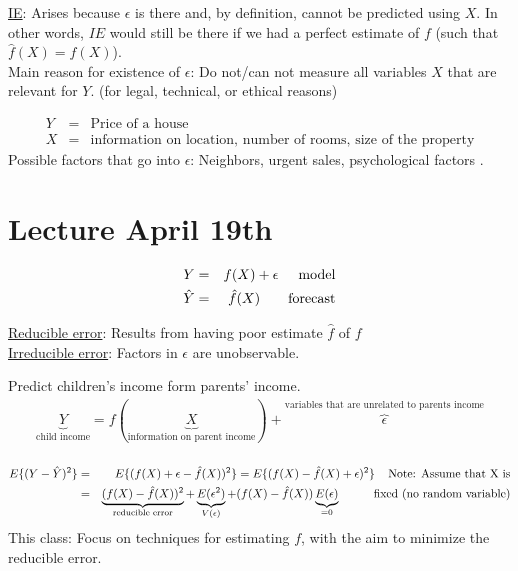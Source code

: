 \documentclass[11pt,a4paper,numbers=endperiod]{scrartcl}
\newcommand{\tit}[1]{\begin{large} \underline{\text{#1}}\end{large}}
\begin{document}
\underline{IE}: Arises because $\epsilon$ is there and, by definition, cannot be predicted using $X$. In other words, $IE$ would still be there if we had a perfect estimate of $f$ (such that $\hat{f}(X) = f(X)$).\\

Main reason for existence of $\epsilon$: Do not/can not measure all variables $X$ that are relevant for $Y$. (for legal, technical, or ethical reasons)

\tit{Example:}
\begin{eqnarray*}
 Y &=& \text{Price of a house}\\
 X &=& \text{information on location, number of rooms, size of the property}
\end{eqnarray*}
Possible factors that go into $\epsilon$: Neighbors, urgent sales, psychological factors .\\

\section{Lecture April 19th}

\begin{eqnarray*}
Y &=& f(X) + \epsilon \hspace*{5mm} \text{model}\\
\hat{Y} &=& \hat{f}(X) \hspace{7mm} \text{forecast}
\end{eqnarray*}

\underline{Reducible error}: Results from having poor estimate $\hat{f}$ of $f$\\
\underline{Irreducible error}: Factors in $\epsilon$ are unobservable.\\

\tit{Example:} Predict children's income form parents' income.
\begin{align*}
	\underbrace{Y}_{\text{child income}} = f(\underbrace{X}_{\text{information on parent income}}) + \overbrace{\epsilon}^{\text{variables that are unrelated to parents income}}\\
\end{align*}

\begin{eqnarray*}
E\{(Y-\hat{Y})^2\} &=& E\{(f(X) + \epsilon - \hat{f}(X))^2\} = E\{(f(X) - \hat{f}(X)+ \epsilon)^2\} \hspace*{4mm}\text{Note: Assume that X is} \\
\hspace*{20.5 mm} &=& \underbrace{(f(X)- \hat{f}(X))^2}_{\text{reducible error}} + \underbrace{E(\epsilon^2)}_{V(\epsilon)} + (f(X) - \hat{f}(X)) \underbrace{E(\epsilon)}_{= 0} \hspace*{10mm} \text{fixed (no random variable)}
\end{eqnarray*}
This class: Focus on techniques for estimating $f$, with the aim to minimize the reducible error.\\
\end{document}
